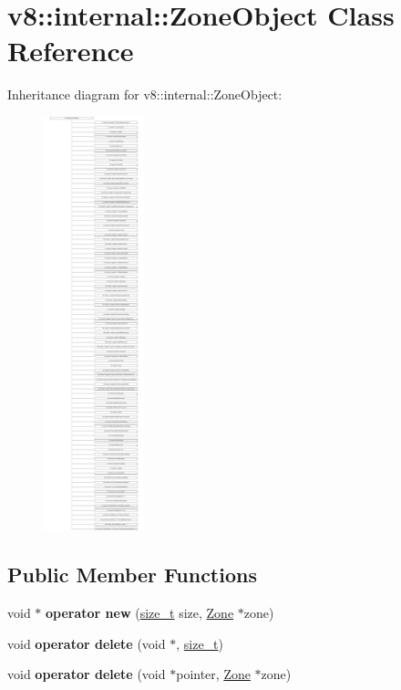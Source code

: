 \hypertarget{classv8_1_1internal_1_1ZoneObject}{}\section{v8\+:\+:internal\+:\+:Zone\+Object Class Reference}
\label{classv8_1_1internal_1_1ZoneObject}
Inheritance diagram for v8\+:\+:internal\+:\+:Zone\+Object\+:\begin{figure}[H]
\begin{center}
\leavevmode
\includegraphics[height=12.000000cm]{classv8_1_1internal_1_1ZoneObject}
\end{center}
\end{figure}
\subsection*{Public Member Functions}
\begin{DoxyCompactItemize}
\item 
\mbox{\label{classv8_1_1internal_1_1ZoneObject_a8ad7c4ba03122924e588baa778296fb7}} 
void $\ast$ {\bfseries operator new} (\mbox{\hyperlink{classsize__t}{size\+\_\+t}} size, \mbox{\hyperlink{classv8_1_1internal_1_1Zone}{Zone}} $\ast$zone)
\item 
\mbox{\label{classv8_1_1internal_1_1ZoneObject_a7cdf166da84374e44eb3558851a17a1b}} 
void {\bfseries operator delete} (void $\ast$, \mbox{\hyperlink{classsize__t}{size\+\_\+t}})
\item 
\mbox{\label{classv8_1_1internal_1_1ZoneObject_a4c1850e80517169980d997db7e81a26b}} 
void {\bfseries operator delete} (void $\ast$pointer, \mbox{\hyperlink{classv8_1_1internal_1_1Zone}{Zone}} $\ast$zone)
\end{DoxyCompactItemize}


